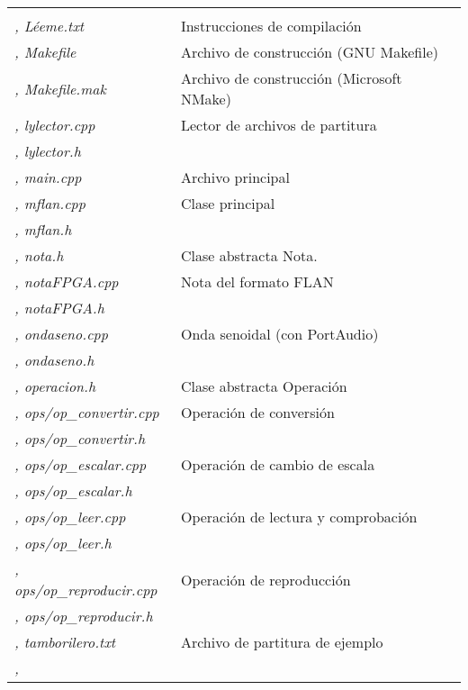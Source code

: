 \documentclass{article}
\begin{document}
\begin{tabu}{| >{\itshape}X[3, l] | X[5, l] |}
	 \\ \sep
	Léeme.txt & Instrucciones de compilación \\ \sep
	Makefile & Archivo de construcción (GNU Makefile) \\ \sep
	Makefile.mak & Archivo de construcción (Microsoft NMake) \\ \sep
	lylector.cpp & Lector de archivos de partitura \\ \sep
	lylector.h & \\ \sep
	main.cpp & Archivo principal \\ \sep
	mflan.cpp & Clase principal \\ \sep
	mflan.h & \\ \sep
	nota.h & Clase abstracta Nota. \\ \sep
	notaFPGA.cpp & Nota del formato FLAN \\ \sep
	notaFPGA.h & \\ \sep
	ondaseno.cpp & Onda senoidal (con PortAudio) \\ \sep
	ondaseno.h & \\ \sep
	operacion.h & Clase abstracta Operación \\ \sep
	ops/op\_convertir.cpp & Operación de conversión \\ \sep
	ops/op\_convertir.h & \\ \sep
	ops/op\_escalar.cpp & Operación de cambio de escala \\ \sep
	ops/op\_escalar.h & \\ \sep
	ops/op\_leer.cpp & Operación de lectura y comprobación \\ \sep
	ops/op\_leer.h & \\ \sep
	ops/op\_reproducir.cpp & Operación de reproducción \\ \sep
	ops/op\_reproducir.h & \\ \sep
	tamborilero.txt & Archivo de partitura de ejemplo \\ \sep


\end{tabu}
\end{document}
